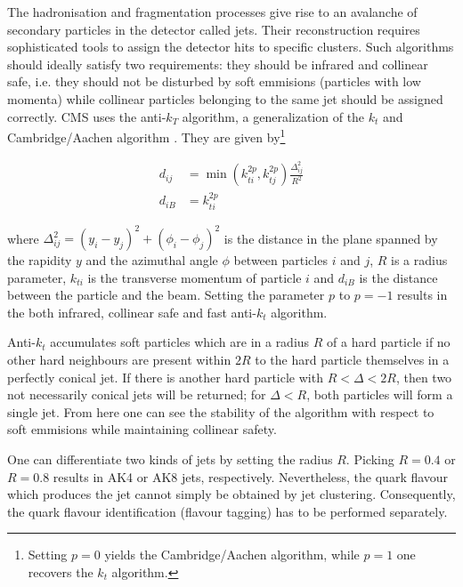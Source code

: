 
The hadronisation and fragmentation processes give rise to an avalanche of secondary particles in the detector called jets. Their reconstruction requires sophisticated tools to assign the detector hits to specific clusters. Such algorithms should ideally satisfy two requirements: they should be infrared and collinear safe, i.e. they should not be disturbed by soft emmisions (particles with low momenta) while collinear particles belonging to the same jet should be assigned correctly. CMS uses the anti-$k_T$ algorithm, a generalization of the $k_t$ and Cambridge/Aachen algorithm \cite{Cacciari_2008}. They are given by\footnote{Setting $p=0$ yields the Cambridge/Aachen algorithm, while $p=1$ one recovers the $k_t$ algorithm.}

\begin{equation*}
	\begin{aligned}
		d_{ij} &= \min\left(k^{2p}_{ti}, k^{2p}_{tj}\right)\frac{\Delta^2_{ij}}{R^2} \\
		d_{iB} &= k^{2p}_{ti}
	\end{aligned}
\end{equation*}

where $\Delta^2_{ij} = (y_i-y_j)^2 + (\phi_i - \phi_j)^2$ is the distance in the plane spanned by the rapidity $y$ and the azimuthal angle $\phi$ between particles $i$ and $j$, $R$ is a radius parameter, $k_{ti}$ is the transverse momentum of particle $i$ and $d_{iB}$ is the distance between the particle and the beam. Setting the parameter $p$ to $p=-1$ results in the both infrared, collinear safe and fast anti-$k_t$ algorithm.

Anti-$k_t$ accumulates soft particles which are in a radius $R$ of a hard particle if no other hard neighbours are present within $2R$  to the hard particle themselves in a perfectly conical jet. If there is another hard particle with $R < \Delta<2R$, then two not necessarily conical jets will be returned; for $\Delta<R$, both particles will form a single jet. From here one can see the stability of the algorithm with respect to soft emmisions while maintaining collinear safety.

One can differentiate two kinds of jets by setting the radius $R$. Picking $R=0.4$ or $R=0.8$ results in AK4 or AK8 jets, respectively. Nevertheless, the quark flavour which produces the jet cannot simply be obtained by jet clustering. Consequently, the quark flavour identification (flavour tagging) has to be performed separately.


